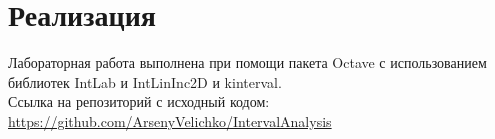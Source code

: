 \section{Реализация}
Лабораторная работа выполнена при помощи пакета Octave с использованием библиотек IntLab и IntLinInc2D и kinterval.\\
Ссылка на репозиторий с исходный кодом:\\
\url{https://github.com/ArsenyVelichko/IntervalAnalysis}